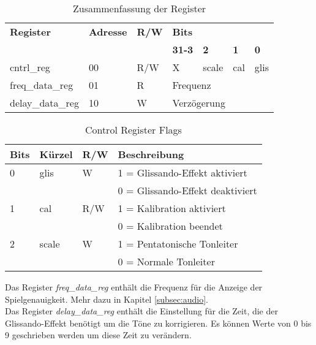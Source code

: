 \begin{table}[H]
	\centering
	\caption{Zusammenfassung der Register}
	\label{tab:Registers_pitch}
	\begin{tabular}{l|l|l|l|l|l|l}
		\textbf{Register} & \textbf{Adresse} & \textbf{R/W} &	\multicolumn{4}{l}{\textbf{Bits}} \\\cline{4-7}
						  &					 &				& \textbf{31-3}  & \textbf{2} & \textbf{1} & \textbf{0}\\ 
		\hline \hline
		
		cntrl\_reg & 00 & R/W & X & scale & cal & glis \\ 
		\hline
		freq\_data\_reg & 01 & R & \multicolumn{4}{l}{Frequenz} \\
		\hline
		delay\_data\_reg & 10 & W & \multicolumn{4}{l}{Verzögerung} \\
	\end{tabular}
\end{table}

\begin{table}[H]
	\centering
	\caption{Control Register Flags}
	\label{tab:Register_pitch_cntrl}
	\begin{tabular}{l|l|l|l}
		\textbf{Bits} & \textbf{Kürzel} & \textbf{R/W} &	\textbf{Beschreibung}\\
		\hline \hline
		
		0 & glis & W &  1 = Glissando-Effekt aktiviert \\ 
		  &      &   &  0 = Glissando-Effekt deaktiviert \\ 
		\hline
		1 & cal & R/W &  1 = Kalibration aktiviert \\ 
		  &     &     &  0 = Kalibration beendet \\ 
		\hline
		2 & scale & W &  1 = Pentatonische Tonleiter \\ 
		 &     &       &  0 = Normale Tonleiter \\ 
		\hline

	\end{tabular}
\end{table}

Das Register \textit{freq\_data\_reg} enthält die Frequenz für die Anzeige der Spielgenauigkeit. Mehr dazu in Kapitel \ref{subsec:audio}. \\
Das Register \textit{delay\_data\_reg} enthält die Einstellung für die Zeit, die der Glissando-Effekt benötigt um die Töne zu korrigieren. Es können Werte von 0 bis 9 geschrieben werden um diese Zeit zu verändern.

